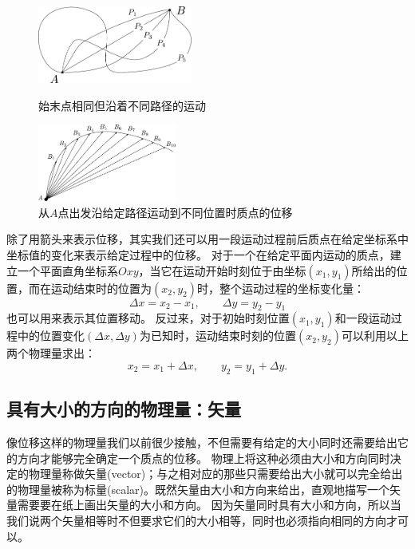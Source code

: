 \begin{figure}[hbtp]
\begin{minipage}[c]{0.45\textwidth}
\includegraphics[height=1in]{images/motion-theory-2.pdf}
\caption{始末点相同但沿着不同路径的运动}
\label{fig: motion-始末点相同但沿着不同路径的运动}
\end{minipage}
\begin{minipage}[c]{0.45\textwidth}
\includegraphics[height=1in]{images/motion-theory-3.pdf}
\caption{从$A$点出发沿给定路径运动到不同位置时质点的位移}
\label{fig: motion-点出发沿给定路径运动到不同位置时质点的位移}
\end{minipage}
\end{figure}

除了用箭头来表示位移，其实我们还可以用一段运动过程前后质点在给定坐标系中坐标值的变化来表示给定过程中的位移。
对于一个在给定平面内运动的质点，建立一个平面直角坐标系$Oxy$，当它在运动开始时刻位于由坐标$(x_1,y_1)$所给出的位置，而在运动结束时的位置为$(x_2,y_2)$时，整个运动过程的坐标变化量：
\[\Delta x = x_2-x_1,\qquad \Delta y = y_2-y_1\]
也可以用来表示其位置移动。
反过来，对于初始时刻位置$(x_1,y_1)$和一段运动过程中的位置变化$(\Delta x,\Delta y)$为已知时，运动结束时刻的位置$(x_2,y_2)$可以利用以上两个物理量求出：
\[x_2 = x_1+\Delta x,\qquad y_2 = y_1+\Delta y.\]

\subsection{具有大小的方向的物理量：矢量}
像位移这样的物理量我们以前很少接触，不但需要有给定的大小同时还需要给出它的方向才能够完全确定一个质点的位移。
物理上将这种必须由大小和方向同时决定的物理量称做{\heiti 矢量(vector)}；与之相对应的那些只需要给出大小就可以完全给出的物理量被称为{\heiti 标量(scalar)}。既然矢量由大小和方向来给出，直观地描写一个矢量需要要在纸上画出矢量的大小和方向。
因为矢量同时具有大小和方向，所以当我们说两个矢量相等时不但要求它们的大小相等，同时也必须指向相同的方向才可以。



